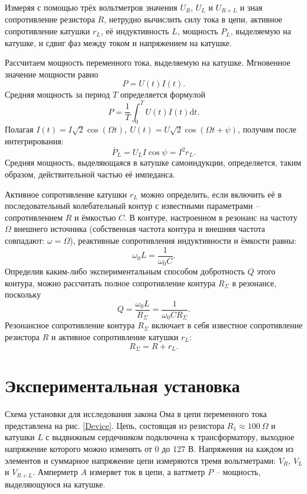 \documentclass[a4paper, 12pt]{article}
\begin{document}
        Измеряя с помощью трёх вольтметров значения $U_R$, $U_L$ и $U_{R+L}$ и зная сопротивление резистора $R$, нетрудно вычислить силу тока в цепи, активное сопротивление катушки $r_L$, её индуктивность $L$, мощность $P_L$, выделяемую на катушке, и сдвиг фаз между током и напряжением на катушке.

        Рассчитаем мощность переменного тока, выделяемую на катушке. Мгновенное значение мощности равно\[P=U(t)I(t).\]Средняя мощность за период $T$ определяется формулой\[P=\frac{1}{T}\int^T_0U(t)I(t)\text{d}t.\]Полагая $I(t)=I\sqrt2\cos{\left(\Omega t\right)},\ U(t)=U\sqrt2\cos{\left(\Omega t+\psi\right)}$, получим после интегрирования:\[\bar{P}_L=U_LI\cos{\psi}=I^2r_L.\]Средняя мощность, выделяющаяся в катушке самоиндукции, определяется, таким образом, действительной частью её импеданса.

        Активное сопротивление катушки $r_L$ можно определить, если включить её в последовательный колебательный контур с известными параметрами -- сопротивлением $R$ и ёмкостью $C$. В контуре, настроенном в резонанс на частоту $\Omega$ внешнего источника (собственная частота контура и внешняя частота совпадают: $\omega=\Omega$), реактивные сопротивления индуктивности и ёмкости равны:\[\omega_0L=\frac{1}{\omega_0C}.\]Определив каким-либо экспериментальным способом добротность $Q$ этого контура, можно рассчитать полное сопротивление контура $R_{\Sigma}$ в резонансе, поскольку\[Q=\frac{\omega_0L}{R_{\Sigma}}=\frac{1}{\omega_0CR_{\Sigma}}.\]Резонансное сопротивление контура $R_{\Sigma}$ включает в себя известное сопротивление резистора $R$ и активное сопротивление катушки $r_L$:\[R_{\Sigma}=R+r_L.\]

        \section*{Экспериментальная установка}

        Схема установки для исследования закона Ома в цепи переменного тока представлена на рис. \ref{Device}. Цепь, состоящая из резистора $R_1\approx100~\Omega$ и катушки $L$ с выдвижным сердечником подключена к трансформатору, выходное напряжение которого можно изменять от 0  до 127 В. Напряжения на каждом из элементов и суммарное напряжение цепи измеряются тремя вольтметрами: $V_R$, $V_L$ и $V_{R+L}$. Амперметр $A$ измеряет ток в цепи, а ваттметр $P$ -- мощность, выделяющуюся на катушке.
\end{document}
